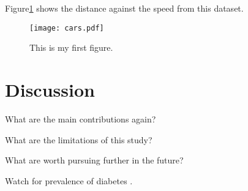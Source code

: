 \documentclass[12pt]{article}
\begin{document}
Figure\ref{fig:cars} shows the distance against the speed from this dataset.
\begin{figure}[tbp]
  \centering
  \texttt{[image: cars.pdf]}
  \caption{This is my first figure.}\label{fig:cars}
\end{figure}

\section{Discussion}\label{sec:disc}

What are the main contributions again?

What are the limitations of this study?

What are worth pursuing further in the future?

\lipsum[1]
Watch for prevalence of diabetes \citep{wild2004global}.
\citet{wild2004global}

\appendix



\end{document}
